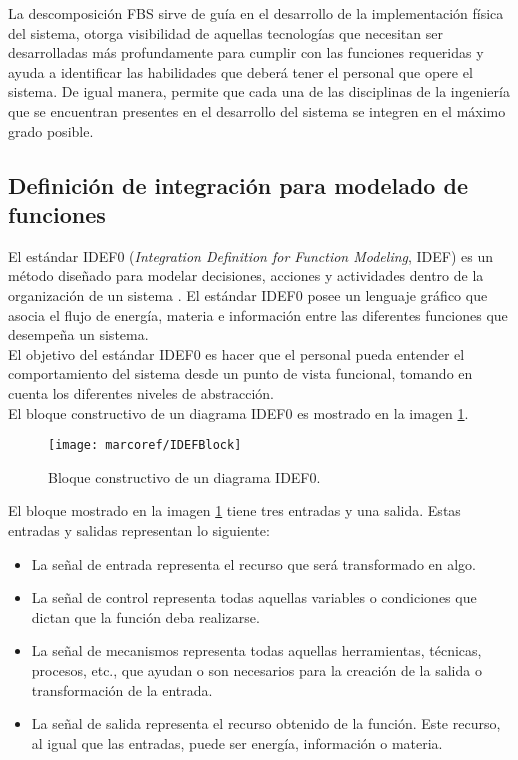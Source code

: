 \noindent La descomposici\'on FBS sirve de gu\'ia en el desarrollo de la implementaci\'on f\'isica del sistema, otorga visibilidad de aquellas tecnolog\'ias que necesitan ser desarrolladas m\'as profundamente para cumplir con las funciones requeridas y ayuda a identificar las habilidades que deber\'a tener el personal que opere el sistema. De igual manera, permite que cada una de las disciplinas de la ingenier\'ia que se encuentran presentes en el desarrollo del sistema se integren en el m\'aximo grado posible. 

		\subsection{Definici\'on de integraci\'on para modelado de funciones} \label{subsec:idef0}
El est\'andar IDEF0 (\textit{Integration Definition for Function Modeling}, IDEF) es un m\'etodo dise\~{n}ado para modelar decisiones, acciones y actividades dentro de la organizaci\'on de un sistema \cite{IDEF0}. El est\'andar IDEF0 posee un lenguaje gr\'afico que asocia el flujo de energ\'ia, materia e informaci\'on entre las diferentes funciones que desempe\~{n}a un sistema.\\

\noindent El objetivo del est\'andar IDEF0 es hacer que el personal pueda entender el comportamiento del sistema desde un punto de vista funcional, tomando en cuenta los diferentes niveles de abstracci\'on.\\

\noindent El bloque constructivo de un diagrama IDEF0 es mostrado en la imagen \ref{img:bloqueidef0}.

\begin{figure}[H]
	\centering
		\texttt{[image: marcoref/IDEFBlock]}
	\caption{Bloque constructivo de un diagrama IDEF0.}
	\label{img:bloqueidef0}
\end{figure}

\noindent El bloque mostrado en la imagen \ref{img:bloqueidef0} tiene tres entradas y una salida. Estas entradas y salidas representan lo siguiente:

\begin{itemize}
	\item La se\~{n}al de entrada representa el recurso que ser\'a transformado en algo.
	\item La se\~{n}al de control representa todas aquellas variables o condiciones que dictan que la funci\'on deba realizarse.
	\item La se\~{n}al de mecanismos representa todas aquellas herramientas, t\'ecnicas, procesos, etc., que ayudan o son necesarios para la creaci\'on de la salida o transformaci\'on de la entrada.
	\item La se\~{n}al de salida representa el recurso obtenido de la funci\'on. Este recurso, al igual que las entradas, puede ser energ\'ia, informaci\'on o materia.
\end{itemize}

